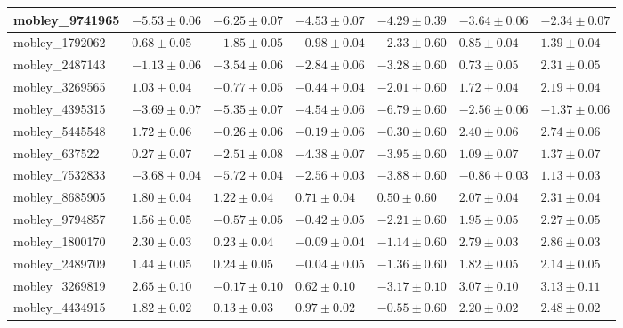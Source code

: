 \documentclass{article}
\begin{document}
\begin{landscape}
\begin{longtable}{|l{3.0cm}|l{3.0cm}|l{3.2cm}|l{3.6cm}|l{3.0cm}|l{3.0cm}|l{3.0cm}|}
mobley\_9741965	&	$	-5.53	\pm	0.06	$	&	$	-6.25	\pm	0.07	$	&	$	-4.53	\pm	0.07	$	&	$	-4.29	\pm	0.39	$	&	$	-3.64	\pm	0.06	$	&	$	-2.34	\pm	0.07	$	\\ \hline
mobley\_1792062	&	$	0.68	\pm	0.05	$	&	$	-1.85	\pm	0.05	$	&	$	-0.98	\pm	0.04	$	&	$	-2.33	\pm	0.60	$	&	$	0.85	\pm	0.04	$	&	$	1.39	\pm	0.04	$	\\ \hline
mobley\_2487143	&	$	-1.13	\pm	0.06	$	&	$	-3.54	\pm	0.06	$	&	$	-2.84	\pm	0.06	$	&	$	-3.28	\pm	0.60	$	&	$	0.73	\pm	0.05	$	&	$	2.31	\pm	0.05	$	\\ \hline
mobley\_3269565	&	$	1.03	\pm	0.04	$	&	$	-0.77	\pm	0.05	$	&	$	-0.44	\pm	0.04	$	&	$	-2.01	\pm	0.60	$	&	$	1.72	\pm	0.04	$	&	$	2.19	\pm	0.04	$	\\ \hline
mobley\_4395315	&	$	-3.69	\pm	0.07	$	&	$	-5.35	\pm	0.07	$	&	$	-4.54	\pm	0.06	$	&	$	-6.79	\pm	0.60	$	&	$	-2.56	\pm	0.06	$	&	$	-1.37	\pm	0.06	$	\\ \hline
mobley\_5445548	&	$	1.72	\pm	0.06	$	&	$	-0.26	\pm	0.06	$	&	$	-0.19	\pm	0.06	$	&	$	-0.30	\pm	0.60	$	&	$	2.40	\pm	0.06	$	&	$	2.74	\pm	0.06	$	\\ \hline
mobley\_637522	&	$	0.27	\pm	0.07	$	&	$	-2.51	\pm	0.08	$	&	$	-4.38	\pm	0.07	$	&	$	-3.95	\pm	0.60	$	&	$	1.09	\pm	0.07	$	&	$	1.37	\pm	0.07	$	\\ \hline
mobley\_7532833	&	$	-3.68	\pm	0.04	$	&	$	-5.72	\pm	0.04	$	&	$	-2.56	\pm	0.03	$	&	$	-3.88	\pm	0.60	$	&	$	-0.86	\pm	0.03	$	&	$	1.13	\pm	0.03	$	\\ \hline
mobley\_8685905	&	$	1.80	\pm	0.04	$	&	$	1.22	\pm	0.04	$	&	$	0.71	\pm	0.04	$	&	$	0.50	\pm	0.60	$	&	$	2.07	\pm	0.04	$	&	$	2.31	\pm	0.04	$	\\ \hline
mobley\_9794857	&	$	1.56	\pm	0.05	$	&	$	-0.57	\pm	0.05	$	&	$	-0.42	\pm	0.05	$	&	$	-2.21	\pm	0.60	$	&	$	1.95	\pm	0.05	$	&	$	2.27	\pm	0.05	$	\\ \hline
mobley\_1800170	&	$	2.30	\pm	0.03	$	&	$	0.23	\pm	0.04	$	&	$	-0.09	\pm	0.04	$	&	$	-1.14	\pm	0.60	$	&	$	2.79	\pm	0.03	$	&	$	2.86	\pm	0.03	$	\\ \hline
mobley\_2489709	&	$	1.44	\pm	0.05	$	&	$	0.24	\pm	0.05	$	&	$	-0.04	\pm	0.05	$	&	$	-1.36	\pm	0.60	$	&	$	1.82	\pm	0.05	$	&	$	2.14	\pm	0.05	$	\\ \hline
mobley\_3269819	&	$	2.65	\pm	0.10	$	&	$	-0.17	\pm	0.10	$	&	$	0.62	\pm	0.10	$	&	$	-3.17	\pm	0.10	$	&	$	3.07	\pm	0.10	$	&	$	3.13	\pm	0.11	$	\\ \hline
mobley\_4434915	&	$	1.82	\pm	0.02	$	&	$	0.13	\pm	0.03	$	&	$	0.97	\pm	0.02	$	&	$	-0.55	\pm	0.60	$	&	$	2.20	\pm	0.02	$	&	$	2.48	\pm	0.02	$	\\ \hline

\end{longtable}
\end{landscape}
\end{document}
